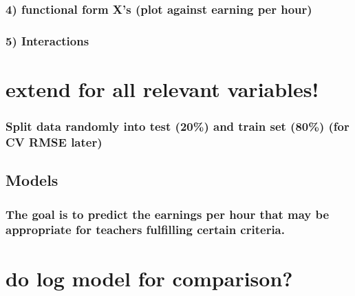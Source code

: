 \documentclass[
]{article}
\begin{document}
\hypertarget{functional-form-xs-plot-against-earning-per-hour}{%
\subsubsection{4) functional form X's (plot against earning per
hour)}\label{functional-form-xs-plot-against-earning-per-hour}}

\hypertarget{interactions}{%
\subsubsection{5) Interactions}\label{interactions}}

\hypertarget{extend-for-all-relevant-variables}{%
\section{extend for all relevant
variables!}\label{extend-for-all-relevant-variables}}

\hypertarget{split-data-randomly-into-test-20-and-train-set-80-for-cv-rmse-later}{%
\subsubsection{Split data randomly into test (20\%) and train set (80\%)
(for CV RMSE
later)}\label{split-data-randomly-into-test-20-and-train-set-80-for-cv-rmse-later}}

\hypertarget{models}{%
\subsection{Models}\label{models}}

\hypertarget{the-goal-is-to-predict-the-earnings-per-hour-that-may-be-appropriate-for-teachers-fulfilling-certain-criteria.}{%
\subsubsection{The goal is to predict the earnings per hour that may be
appropriate for teachers fulfilling certain
criteria.}\label{the-goal-is-to-predict-the-earnings-per-hour-that-may-be-appropriate-for-teachers-fulfilling-certain-criteria.}}

\hypertarget{do-log-model-for-comparison}{%
\section{do log model for
comparison?}\label{do-log-model-for-comparison}}
\end{document}
